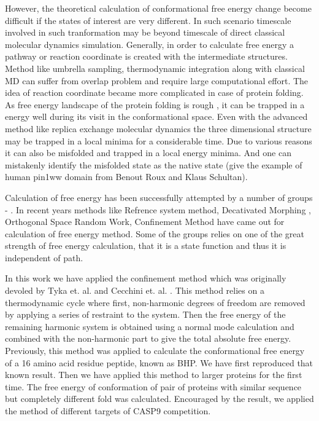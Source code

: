 \documentclass[12pt]{article}
\begin{document}
However, the theoretical calculation of conformational free energy change become difficult if the
states of interest are very different. In such scenario timescale involved in such tranformation may
be beyond timescale of direct classical molecular dynamics simulation.  Generally, in order to
calculate free energy a pathway or reaction coordinate is created with the intermediate structures.
Method like umbrella sampling, thermodynamic integration along with classical MD can suffer from
overlap problem and require large computational effort. The idea of reaction coordinate became more
complicated in case of protein folding.  As free energy landscape of the protein folding is rough \cite{Dill1997},
it can be trapped in a energy well during its visit in the conformational space. Even with the
advanced method like replica exchange molecular dynamics the three dimensional structure may be
trapped in a local minima for a considerable time. Due to various reasons it can also be misfolded
and trapped in a local energy minima. And one can mistakenly identify the misfolded state as the
native state (give the example of human pin1ww domain from Benout Roux and Klaus Schultan).

Calculation of free energy has been successfully attempted by a number of groups \cite{Ytreberg2006} - \cite{Zheng2008}. In
recent years methods like Refrence system method, Decativated Morphing \cite{Park2008}, Orthogonal Space Random
Work, Confinement Method have came out for calculation of free energy method. Some of the groups
relies on one of the great strength of free energy calculation, that it is a state function and thus
it is independent of path.

In this work we have applied the confinement method which was originally devoled by Tyka et. al. \cite{Tyka2006} and
Cecchini et. al. \cite{Cecchini2009}. This method relies on a thermodynamic cycle where first, non-harmonic degrees of
freedom are removed by applying a series of restraint to the system. Then the free energy of the
remaining harmonic system is obtained using a normal mode calculation and combined with the
non-harmonic part to give the total absolute free energy.  Previously, this method was applied to
calculate the conformational free energy of a 16 amino acid residue peptide, known as BHP.  We have
first reproduced that known result. Then we have applied this method to larger proteins for the
first time. The free energy of conformation of pair of proteins with similar sequence but completely
different fold was calculated. Encouraged by the result, we applied the method of different targets
of CASP9 competition.
\end{document}

